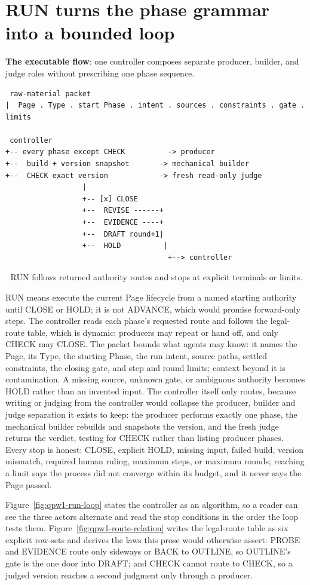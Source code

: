 \section{RUN turns the phase grammar into a bounded loop}
\textbf{The executable flow}: one controller composes separate producer, builder, and judge roles without prescribing one phase sequence.

\begin{verbatim}
 raw-material packet
|  Page . Type . start Phase . intent . sources . constraints . gate . limits

 controller
+-- every phase except CHECK          -> producer
+--  build + version snapshot       -> mechanical builder
+--  CHECK exact version            -> fresh read-only judge
                  |
                  +-- [x] CLOSE
                  +--  REVISE ------+
                  +--  EVIDENCE ----+
                  +--  DRAFT round+1|
                  +--  HOLD          |
                                      +--> controller
\end{verbatim}
📌 RUN follows returned authority routes and stops at explicit terminals or limits.

RUN means execute the current Page lifecycle from a named starting authority until CLOSE or HOLD; it is not ADVANCE, which would promise forward-only steps. The controller reads each phase's requested route and follows the legal-route table, which is dynamic: producers may repeat or hand off, and only CHECK may CLOSE. The packet bounds what agents may know: it names the Page, its Type, the starting Phase, the run intent, source paths, settled constraints, the closing gate, and step and round limits; context beyond it is contamination. A missing source, unknown gate, or ambiguous authority becomes HOLD rather than an invented input. The controller itself only routes, because writing or judging from the controller would collapse the producer, builder and judge separation it exists to keep: the producer performs exactly one phase, the mechanical builder rebuilds and snapshots the version, and the fresh judge returns the verdict, testing for CHECK rather than listing producer phases. Every stop is honest: CLOSE, explicit HOLD, missing input, failed build, version mismatch, required human ruling, maximum steps, or maximum rounds; reaching a limit says the process did not converge within its budget, and it never says the Page passed.

Figure~\ref{fig:qpw1-run-loop} states the controller as an algorithm, so a reader can see the three actors alternate and read the stop conditions in the order the loop tests them. Figure~\ref{fig:qpw1-route-relation} writes the legal-route table as six explicit row-sets and derives the laws this prose would otherwise assert: PROBE and EVIDENCE route only sideways or BACK to OUTLINE, so OUTLINE's gate is the one door into DRAFT; and CHECK cannot route to CHECK, so a judged version reaches a second judgment only through a producer.


